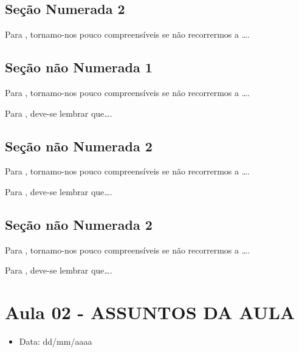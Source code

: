 \documentclass[
]{book}
\providecommand{\tightlist}{%
  \setlength{\itemsep}{0pt}\setlength{\parskip}{0pt}}
\begin{document}
\hypertarget{seuxe7uxe3o-numerada-2-23}{%
\subsection{Seção Numerada 2}\label{seuxe7uxe3o-numerada-2-23}}

Para \citet{BOCK2001}, tornamo-nos pouco compreensíveis se não recorrermos a \ldots.

\hypertarget{seuxe7uxe3o-nuxe3o-numerada-1-47}{%
\subsection*{Seção não Numerada 1}\label{seuxe7uxe3o-nuxe3o-numerada-1-47}}

Para \citet{BOCK2001}, tornamo-nos pouco compreensíveis se não recorrermos a \ldots.

Para \citet{DAVIDOFF2001}, deve-se lembrar que\ldots.

\hypertarget{seuxe7uxe3o-nuxe3o-numerada-2-70}{%
\subsection*{Seção não Numerada 2}\label{seuxe7uxe3o-nuxe3o-numerada-2-70}}

Para \citet{BOCK2001}, tornamo-nos pouco compreensíveis se não recorrermos a \ldots.

Para \citet{DAVIDOFF2001}, deve-se lembrar que\ldots.

\hypertarget{seuxe7uxe3o-nuxe3o-numerada-2-71}{%
\subsection*{Seção não Numerada 2}\label{seuxe7uxe3o-nuxe3o-numerada-2-71}}

Para \citet{BOCK2001}, tornamo-nos pouco compreensíveis se não recorrermos a \ldots.

Para \citet{DAVIDOFF2001}, deve-se lembrar que\ldots.

\hypertarget{aula-02---assuntos-da-aula-6}{%
\section{Aula 02 - ASSUNTOS DA AULA}\label{aula-02---assuntos-da-aula-6}}

\begin{itemize}
\tightlist
\item
  Data: dd/mm/aaaa
\end{itemize}
\end{document}

